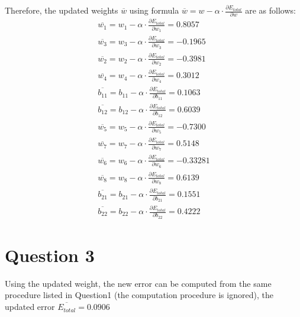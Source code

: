 \documentclass[12pt,a4paper]{article}
\begin{document}
Therefore, the updated weights $\overline{w}$ using formula $\overline{w} = w - \alpha \cdot \frac{\partial E_{total}}{\partial w}$ are as follows:
\begin{align*}
\overline{w_1} = w_1 - \alpha \cdot \frac{\partial E_{total}}{\partial w_1} = 0.8057 \\
\overline{w_3} = w_3 - \alpha \cdot \frac{\partial E_{total}}{\partial w_3} = -0.1965 \\
\overline{w_2} = w_2 - \alpha \cdot \frac{\partial E_{total}}{\partial w_2} = -0.3981 \\
\overline{w_4} = w_4 - \alpha \cdot \frac{\partial E_{total}}{\partial w_4} = 0.3012 \\
\overline{b_{11}} = b_{11} - \alpha \cdot \frac{\partial E_{total}}{\partial b_{11}} = 0.1063 \\
\overline{b_{12}} = b_{12} - \alpha \cdot \frac{\partial E_{total}}{\partial b_{12}} = 0.6039 \\
\overline{w_5} = w_5 - \alpha \cdot \frac{\partial E_{total}}{\partial w_5} = -0.7300 \\
\overline{w_7} = w_7 - \alpha \cdot \frac{\partial E_{total}}{\partial w_7} = 0.5148 \\
\overline{w_6} = w_6 - \alpha \cdot \frac{\partial E_{total}}{\partial w_6} = -0.33281 \\
\overline{w_8} = w_8 - \alpha \cdot \frac{\partial E_{total}}{\partial w_8} = 0.6139 \\
\overline{b_{21}} = b_{21} - \alpha \cdot \frac{\partial E_{total}}{\partial b_{21}} = 0.1551 \\
\overline{b_{22}} = b_{22} - \alpha \cdot \frac{\partial E_{total}}{\partial b_{22}} = 0.4222 
\end{align*}

\section{Question 3}
Using the updated weight, the new error can be computed from the same procedure listed in Question1 (the computation procedure is ignored), the updated error $\overline{E_{total}} = 0.0906$
\end{document}

